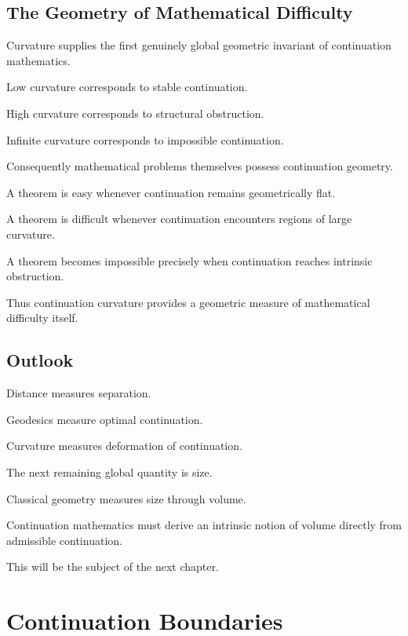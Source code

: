 \documentclass[13pt,openany]{book}
\theoremstyle{plain}
\theoremstyle{definition}
\begin{document}

\section{The Geometry of Mathematical Difficulty}

Curvature supplies the first genuinely global geometric invariant of continuation mathematics.

Low curvature corresponds to stable continuation.

High curvature corresponds to structural obstruction.

Infinite curvature corresponds to impossible continuation.

Consequently mathematical problems themselves possess continuation geometry.

A theorem is easy whenever continuation remains geometrically flat.

A theorem is difficult whenever continuation encounters regions of large curvature.

A theorem becomes impossible precisely when continuation reaches intrinsic obstruction.

Thus continuation curvature provides a geometric measure of mathematical difficulty itself.


\section{Outlook}

Distance measures separation.

Geodesics measure optimal continuation.

Curvature measures deformation of continuation.

The next remaining global quantity is size.

Classical geometry measures size through volume.

Continuation mathematics must derive an intrinsic notion of volume directly from admissible continuation.

This will be the subject of the next chapter.

\chapter{Continuation Boundaries}
\end{document}
